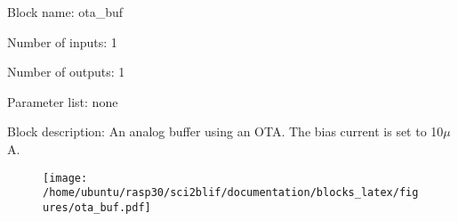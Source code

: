 \pagebreak

Block name: ota\_buf

Number of inputs: 1

Number of outputs: 1

Parameter list: none

Block description: 
An analog buffer using an OTA. The bias current is set to 10$\mu$A.

\begin{figure}[H]  %
\texttt{[image: /home/ubuntu/rasp30/sci2blif/documentation/blocks\_latex/figures/ota\_buf.pdf]}
\end{figure}


